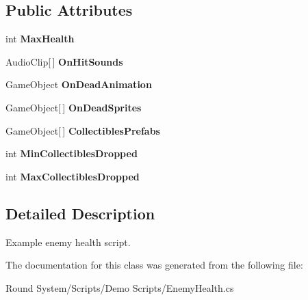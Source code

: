\subsection*{Public Attributes}
\begin{DoxyCompactItemize}
\item 
\hypertarget{class_round_manager_1_1_enemy_health_adb176d5ece30812f53bea7beeab6f266}{}int {\bfseries Max\+Health}\label{class_round_manager_1_1_enemy_health_adb176d5ece30812f53bea7beeab6f266}

\item 
\hypertarget{class_round_manager_1_1_enemy_health_aaaff55d130d54c850d8e0fb194103101}{}Audio\+Clip\mbox{[}$\,$\mbox{]} {\bfseries On\+Hit\+Sounds}\label{class_round_manager_1_1_enemy_health_aaaff55d130d54c850d8e0fb194103101}

\item 
\hypertarget{class_round_manager_1_1_enemy_health_a0e1b97bf36fc455c07b9c5563e6ccf17}{}Game\+Object {\bfseries On\+Dead\+Animation}\label{class_round_manager_1_1_enemy_health_a0e1b97bf36fc455c07b9c5563e6ccf17}

\item 
\hypertarget{class_round_manager_1_1_enemy_health_a17db80b5f15cb11d30518a18de9a0281}{}Game\+Object\mbox{[}$\,$\mbox{]} {\bfseries On\+Dead\+Sprites}\label{class_round_manager_1_1_enemy_health_a17db80b5f15cb11d30518a18de9a0281}

\item 
\hypertarget{class_round_manager_1_1_enemy_health_abc7b11795287564a0c777334eec0ed3a}{}Game\+Object\mbox{[}$\,$\mbox{]} {\bfseries Collectibles\+Prefabs}\label{class_round_manager_1_1_enemy_health_abc7b11795287564a0c777334eec0ed3a}

\item 
\hypertarget{class_round_manager_1_1_enemy_health_a384823558355c1b872f9f77a838b72e0}{}int {\bfseries Min\+Collectibles\+Dropped}\label{class_round_manager_1_1_enemy_health_a384823558355c1b872f9f77a838b72e0}

\item 
\hypertarget{class_round_manager_1_1_enemy_health_ab4d07023bd90d039f21900f29028957e}{}int {\bfseries Max\+Collectibles\+Dropped}\label{class_round_manager_1_1_enemy_health_ab4d07023bd90d039f21900f29028957e}

\end{DoxyCompactItemize}


\subsection{Detailed Description}
Example enemy health script. 



The documentation for this class was generated from the following file\+:\begin{DoxyCompactItemize}
\item 
Round System/\+Scripts/\+Demo Scripts/Enemy\+Health.\+cs\end{DoxyCompactItemize}
